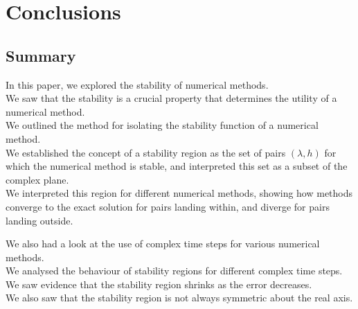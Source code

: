 \section{Conclusions}

\subsection{Summary}
\par In this paper, we explored the stability of numerical methods.\\
We saw that the stability is a crucial property that determines the utility of a numerical method.\\
We outlined the method for isolating the stability function of a numerical method.\\
We established the concept of a stability region as the set of pairs $(\lambda, h)$ for which the numerical method is stable, and interpreted this set as a subset of the complex plane.\\
We interpreted this region for different numerical methods, showing how methods converge to the exact solution for pairs landing within, and diverge for pairs landing outside.\\

\par We also had a look at the use of complex time steps for various numerical methods.\\
We analysed the behaviour of stability regions for different complex time steps.\\
We saw evidence that the stability region shrinks as the error decreases.\\
We also saw that the stability region is not always symmetric about the real axis.\\

